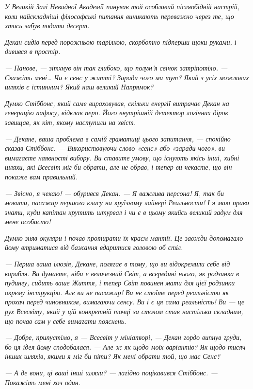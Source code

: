 \documentclass[12pt, a4paper, openany]{book}
\begin{document}
\begin{terrybox}
\textit{У Великій Залі Невидної Академії панував той особливий післяобідній настрій, коли найскладніші філософські питання виникають переважно через те, що хтось забув подати десерт.}

\textit{Декан сидів перед порожньою тарілкою, скорботно підперши щоки руками, і дивився в простір.}

\textit{--- Панове, --- зітхнув він так глибоко, що полум'я свічок затріпотіло. --- Скажіть мені\ldots{} Чи є сенс у житті? Заради чого ми тут? Який з усіх можливих шляхів є істинним? Який наш великий Напрямок?}

\textit{Думко Стіббонс, який саме вираховував, скільки енергії витрачає Декан на генерацію пафосу, відклав перо. Його внутрішній детектор логічних дірок завищав, як кіт, якому наступили на хвіст.}

\textit{--- Декане, ваша проблема в самій граматиці цього запитання, --- спокійно сказав Стіббонс. --- Використовуючи слово «сенс» або «заради чого», ви вимагаєте наявності вибору. Ви ставите умову, що існують якісь інші, хибні шляхи, які Всесвіт міг би обрати, але не обрав, і тепер ви чекаєте, що він покаже вам правильний.}

\textit{--- Звісно, я чекаю! --- обурився Декан. --- Я важлива персона! Я, так би мовити, пасажир першого класу на круїзному лайнері Реальности! І я маю право знати, куди капітан крутить штурвал і чи є в цьому якийсь великий задум для мене особисто!}

\textit{Думко зняв окуляри і почав протирати їх краєм мантії. Це завжди допомагало йому втриматися від бажання вдаритися головою об стіл.}

\textit{--- Перша ваша ілюзія, Декане, полягає в тому, що ви відокремили себе від корабля. Ви думаєте, ніби є величезний Світ, а всередині нього, як родзинка в пудингу, сидить ваше Життя, і тепер Світ повинен мати для цієї родзинки окрему інструкцію. Але ви не пасажир! Ви не стоїте \emph{перед} реальністю як прохач перед чиновником, вимагаючи сенсу. Ви і є ця сама реальність! Ви --- це рух Всесвіту, який у цій конкретній точці за столом став настільки складним, що почав сам у себе вимагати пояснень.}

\textit{--- Добре, припустімо, я --- Всесвіт у мініатюрі, --- Декан гордо випнув груди, бо ця ідея йому сподобалася. --- Але ж як щодо моїх варіантів? Як щодо тисяч інших шляхів, якими я міг би піти? Як мені обрати той, що має Сенс?}

\textit{--- А де вони, ці ваші інші шляхи? --- лагідно поцікавився Стіббонс. --- Покажіть мені хоч один.}


\end{terrybox}
\end{document}
